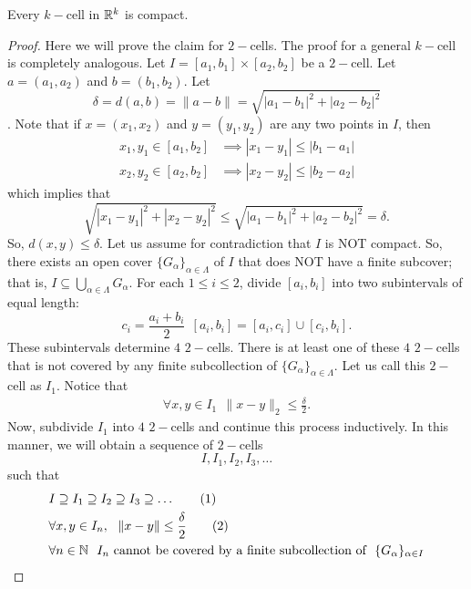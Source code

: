 \documentclass[a4paper]{report}
\begin{document}
\begin{theorem}[ ]
Every \( k- \)cell in \( \mathbb{R}^{k} \) is compact.    
\end{theorem}
\begin{proof}
    Here we will prove the claim for \( 2- \)cells. The proof for a general \( k- \)cell is completely analogous. Let \( I = [{a}_{1}, {b}_{1}] \times [{a}_{2}, {b}_{2}] \) be a \( 2- \)cell. Let \( a = ({a}_{1}, {a}_{2})  \) and \( b = ({b}_{1}, {b}_{2}) \). Let \[ \delta = d(a,b) = \| a - b\| = \sqrt{ | {a}_{1} - {b}_{1} |^{2} + | {a}_{2} - {b}_{2} |^{2} }  \]. Note that if \( x = ({x}_{1}, {x}_{2}) \) and \( y = ({y}_{1}, {y}_{2}) \) are any two points in \( I  \), then
    \begin{align*}
    {x}_{1}, {y}_{1} \in [{a}_{1}, {b}_{2}] &\implies | {x}_{1} - {y}_{1}  |  \leq | {b}_{1} - {a}_{1} |  \\
    {x}_{2}, {y}_{2} \in [{a}_{2}, {b}_{2}]                     &\implies  | {x}_{2} - {y}_{2} |  \leq | {b}_{2} - {a}_{2} |
\end{align*}
which implies that 
\[ \sqrt{ | {x}_{1} - {y}_{1} |^{2} + | {x}_{2} - {y}_{2} |^{2} } \leq \sqrt{ | {a}_{1} - {b}_{1} |^{2} + | {a}_{2} - {b}_{2}  |^{2} } = \delta.  \]
So, \( d(x,y) \leq \delta \).
Let us assume for contradiction that \( I  \) is NOT compact. So, there exists an open cover \( \{ {G}_{\alpha} \}_{\alpha \in \Lambda} \) of \( I  \) that does NOT have a finite subcover; that is, \( I \subseteq \bigcup_{ \alpha \in \Lambda }^{  } {G}_{\alpha} \). For each \( 1 \leq i \leq 2  \), divide \( [{a}_{i}, {b}_{i}] \) into two subintervals of equal length:
\[  {c}_{i} = \frac{ {a}_{i} + {b}_{i} }{ 2 }  \ \ [{a}_{i}, {b}_{i}] = [{a}_{i}, {c}_{i}] \cup [{c}_{i}, {b}_{i}]. \]
These subintervals determine \( 4  \) \( 2 - \)cells. There is at least one of these \( 4  \) \( 2- \)cells that is not covered by any finite subcollection of \( \{ {G}_{\alpha} \}_{\alpha \in \Lambda} \). Let us call this \( 2- \)cell as \( {I}_{1} \). Notice that 
\begin{align*}
    \forall x,y \in {I}_{1}  \ \  \|x - y\|_2 \leq \frac{ \delta }{ 2 }.
\end{align*}
Now, subdivide \( {I}_{1} \) into \( 4  \) \( 2- \)cells and continue this process inductively. In this manner, we will obtain a sequence of \( 2- \)cells 
\[ I, {I}_{1}, {I}_{2}, {I}_{3}, \dots  \]
such that 
\begin{align*}
    &I \supseteq {I}_{1} \supseteq {I}_{2} \supseteq {I}_{3} \supseteq \dots  \tag{1} \\
    &\forall x,y \in {I}_{n},  \ \ \| x - y \| \leq \frac{ \delta }{ 2 }  \tag{2} \\
    &\forall n \in \mathbb{N}  \ \   {I}_{n} \  \text{cannot be covered by a finite subcollection of} \ \  \{ {G}_{\alpha} \}_{\alpha \in I}
\end{align*}

\end{proof}
\end{document}
